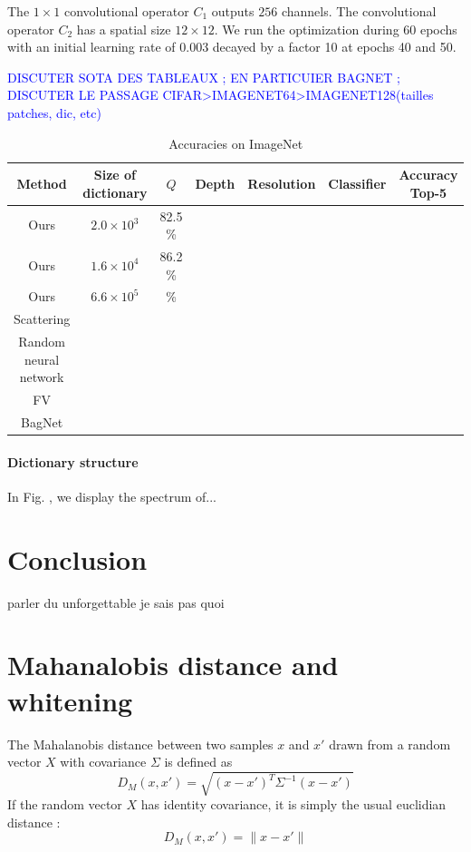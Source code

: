 \documentclass{article}
\newcommand{\Edouard}[1]{\textcolor{blue}{#1}}
\begin{document}
The $1 \times 1$ convolutional operator $C_1$ outputs $256$ channels.
The convolutional operator $C_2$ has a spatial size $12 \times 12$.
We run the optimization during 60 epochs with an initial learning rate of 0.003 decayed by a factor 10 at epochs 40 and 50.

\Edouard{DISCUTER SOTA DES TABLEAUX ; EN PARTICUIER BAGNET ; DISCUTER LE PASSAGE CIFAR>IMAGENET64>IMAGENET128(tailles patches, dic, etc)}


\begin{table}[h]
  \caption{Accuracies on ImageNet}
  \label{accuracy}
  \centering
  \begin{tabular}{|c|c|c|c|c|c|c|}
    \hline 
    Method&Size of dictionary&$Q$&Depth &Resolution&Classifier& Accuracy Top-5\\
    \hline 
    \hline
    Ours&$2.0\times 10^3$ & 82.5 \%\\
    \hline 
    Ours&$1.6\times10^4$ & 86.2 \%\\
    \hline 
    Ours&$6.6\times 10^5$  & \%\\
    \hline
    Scattering\\
    \hline 
    Random neural network\\
    \hline
    FV\\
    \hline
    BagNet\\
    \hline
  \end{tabular}
\end{table}


\paragraph{Dictionary structure} In Fig. \label{spectrum}, we display the spectrum of...


\section{Conclusion}
parler du unforgettable je sais pas quoi




{}

\newpage

\appendix

\section{Mahanalobis distance and whitening}

The Mahalanobis distance \citep{chandra1936generalised, mclachlan1999mahalanobis} between two samples $x$ and $x'$ drawn from a random vector $X$ with covariance $\Sigma$ is defined as  
\[ D_M (x, x' ) =  \sqrt{ (x - x')^T \Sigma^{-1} (x - x')} \]
If the random vector $X$ has identity covariance, it is simply the usual euclidian distance :
\[ D_M (x, x' ) =  \| x - x' \| \]
\end{document}

